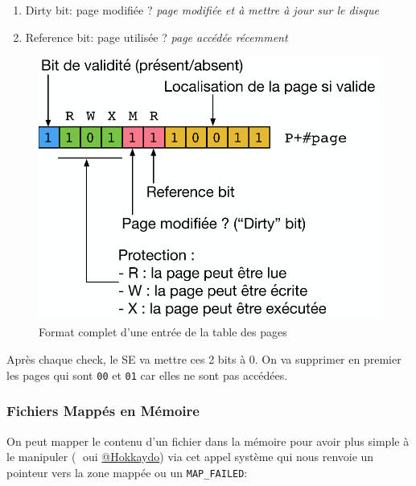 \begin{enumerate}
\def\labelenumi{\arabic{enumi}.}
\tightlist
\item
  Dirty bit: page modifiée ? \emph{page modifiée et à mettre à jour sur
  le disque}
\item
  Reference bit: page utilisée ? \emph{page accédée récemment}
\end{enumerate}

\begin{figure}
\centering
\includegraphics{image-60.png}
\caption{Format complet d'une entrée de la table des pages}
\end{figure}

Après chaque check, le SE va mettre ces 2 bits à 0. On va supprimer en
premier les pages qui sont \texttt{00} et \texttt{01} car elles ne sont
pas accédées.

\subsubsection{Fichiers Mappés en
Mémoire}\label{fichiers-mappuxe9s-en-muxe9moire}

On peut mapper le contenu d'un fichier dans la mémoire pour avoir plus
simple à le manipuler (👀 oui
\href{https://media.discordapp.net/attachments/517720163223601155/1113851521029910569/GOODBOOOOOI.gif}{@Hokkaydo})
via cet appel système qui nous renvoie un pointeur vers la zone mappée
ou un \texttt{MAP\_FAILED}:


